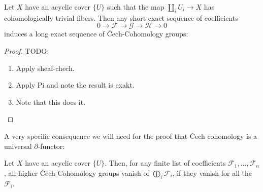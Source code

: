 \begin{theorem}%
  \label{chech-les}
  Let $X$ have an acyclic cover $\{U\}$ such that the map $\coprod_i U_i\to X$ has cohomologically trivial fibers.
  Then any short exact sequence of coefficients
  \[ 0\to \mathcal F\to \mathcal G\to \mathcal H\to 0\]
  induces a long exact sequence of \v{C}ech-Cohomology groups:
  \begin{center}
  \end{center}
\end{theorem}

\begin{proof}
  TODO:
  \begin{enumerate}
  \item Apply sheaf-chech.
  \item Apply Pi and note the result is exakt.
  \item Note that this does it.
  \end{enumerate}
\end{proof}

A very specific consequence we will need for the proof that \v{C}ech cohomology is a universal $\partial$-functor:

\begin{corollary}%
  \label{chech-coefficient-sum}
  Let $X$ have an acyclic cover $\{U\}$.
  Then, for any finite list of coefficients $\mathcal F_1,\dots,\mathcal F_n$,
  all higher \v{C}ech-Cohomology groups vanish of $\bigoplus_{i}\mathcal F_i$,
  if they vanish for all the $\mathcal F_i$.
\end{corollary}
